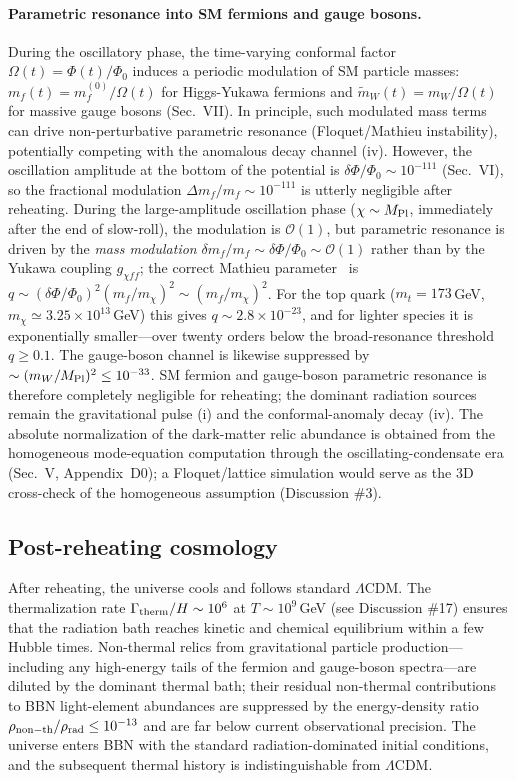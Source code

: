 \documentclass[pdflatex,sn-mathphys-num]{sn-jnl}
\newcommand{\MP}{M_{\rm Pl}}
\newcommand{\PhiV}{\Phi_0}
\theoremstyle{thmstyleone}
\begin{document}
\paragraph{Parametric resonance into SM fermions and gauge bosons.} During the oscillatory phase, the time-varying conformal factor $\Omega(t)=\Phi(t)/\PhiV$ induces a periodic modulation of SM particle masses: $m_f(t)=m_f^{(0)}/\Omega(t)$ for Higgs-Yukawa fermions and $\tilde m_W(t)=m_W/\Omega(t)$ for massive gauge bosons (Sec.~VII). In principle, such modulated mass terms can drive non-perturbative parametric resonance (Floquet/Mathieu instability), potentially competing with the anomalous decay channel (iv). However, the oscillation amplitude at the bottom of the potential is $\delta\Phi/\PhiV\sim10^{-111}$ (Sec.~VI), so the fractional modulation $\Delta m_f/m_f\sim10^{-111}$ is utterly negligible after reheating. During the large-amplitude oscillation phase ($\chi\sim\MP$, immediately after the end of slow-roll), the modulation is $\mathcal{O}(1)$, but parametric resonance is driven by the \emph{mass modulation} $\delta m_f/m_f\sim\delta\Phi/\PhiV\sim\mathcal{O}(1)$ rather than by the Yukawa coupling $g_{\chi ff}$; the correct Mathieu parameter~\cite{Kofman1997} is $q\sim(\delta\Phi/\PhiV)^2(m_f/m_\chi)^2\sim(m_f/m_\chi)^2$. For the top quark ($m_t=173\,$GeV, $m_\chi\simeq3.25\times10^{13}\,$GeV) this gives $q\sim2.8\times10^{-23}$, and for lighter species it is exponentially smaller---over twenty orders below the broad-resonance threshold $q\geq0.1$. The gauge-boson channel is likewise suppressed by $\sim(m_W/\MP)^2\leq10^{-33}$. SM fermion and gauge-boson parametric resonance is therefore completely negligible for reheating; the dominant radiation sources remain the gravitational pulse (i) and the conformal-anomaly decay (iv). The absolute normalization of the dark-matter relic abundance is obtained from the homogeneous mode-equation computation through the oscillating-condensate era (Sec.~V, Appendix~D0); a Floquet/lattice simulation would serve as the 3D cross-check of the homogeneous assumption (Discussion \#3).

\subsection{Post-reheating cosmology}

After reheating, the universe cools and follows standard $\Lambda$CDM. The thermalization rate $\Gamma_{\rm therm}/H\sim10^{6}$ at $T\sim10^9\,$GeV (see Discussion \#17) ensures that the radiation bath reaches kinetic and chemical equilibrium within a few Hubble times. Non-thermal relics from gravitational particle production---including any high-energy tails of the fermion and gauge-boson spectra---are diluted by the dominant thermal bath; their residual non-thermal contributions to BBN light-element abundances are suppressed by the energy-density ratio $\rho_{\rm non-th}/\rho_{\rm rad}\leq10^{-13}$ and are far below current observational precision. The universe enters BBN with the standard radiation-dominated initial conditions, and the subsequent thermal history is indistinguishable from $\Lambda$CDM.
\end{document}
